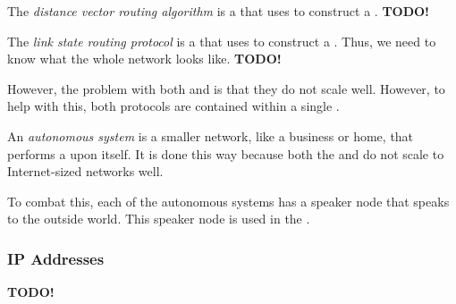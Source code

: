 \begin{definition}\label{def:Distance_Vector_Routing_Protocol}
  The \emph{distance vector routing algorithm} is a  that uses  to construct a .
  \textbf{TODO!}
\end{definition}

\begin{definition}\label{def:Link_State_Routing_Protocol}
  The \emph{link state routing protocol} is a  that uses  to construct a .
  Thus, we need to know what the whole network looks like.
  \textbf{TODO!}
\end{definition}

However, the problem with both  and  is that they do not scale well.
However, to help with this, both protocols are contained within a single .

\begin{definition}\label{def:Autonomous_System}
  An \emph{autonomous system} is a smaller network, like a business or home, that performs a  upon itself.
  It is done this way because both the  and  do not scale to Internet-sized networks well.

  To combat this, each of the autonomous systems has a speaker node that speaks to the outside world.
  This speaker node is used in the .
\end{definition}

\begin{definition}\label{def:Path_Vector_Routing_Protocol}
  
\end{definition}

\subsubsection{IP Addresses}\label{subsubsec:IP_Addresses}
\begin{definition}[IP Address]\label{def:IP_Address}
  \textbf{TODO!}
\end{definition}


